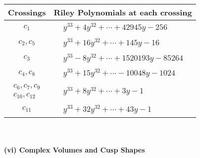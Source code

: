 \documentclass[1p]{elsarticle_modified}
\theoremstyle{definition}
\begin{document}
\begin{tabular}{m{50pt}|m{274pt}}
Crossings & \hspace{64pt}Riley Polynomials at each crossing \\
\hline $$\begin{aligned}c_{1}\end{aligned}$$&$\begin{aligned}
&y^{33}+4 y^{32}+\cdots+42945 y-256
\end{aligned}$\\
\hline $$\begin{aligned}c_{2},c_{5}\end{aligned}$$&$\begin{aligned}
&y^{33}+16 y^{32}+\cdots+145 y-16
\end{aligned}$\\
\hline $$\begin{aligned}c_{3}\end{aligned}$$&$\begin{aligned}
&y^{33}-8 y^{32}+\cdots+1520193 y-85264
\end{aligned}$\\
\hline $$\begin{aligned}c_{4},c_{8}\end{aligned}$$&$\begin{aligned}
&y^{33}+15 y^{32}+\cdots-10048 y-1024
\end{aligned}$\\
\hline $$\begin{aligned}c_{6},c_{7},c_{9}\\c_{10},c_{12}\end{aligned}$$&$\begin{aligned}
&y^{33}+8 y^{32}+\cdots+3 y-1
\end{aligned}$\\
\hline $$\begin{aligned}c_{11}\end{aligned}$$&$\begin{aligned}
&y^{33}+32 y^{32}+\cdots+43 y-1
\end{aligned}$\\
\hline
\end{tabular}\\~\\
\newpage\flushleft \textbf{(vi) Complex Volumes and Cusp Shapes}
\end{document}
